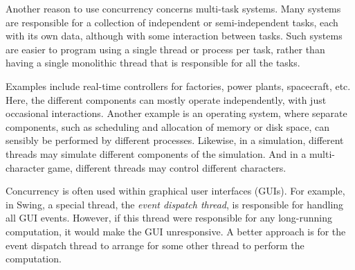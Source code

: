 
Another reason to use concurrency concerns multi-task systems.  Many systems
are responsible for a collection of independent or semi-independent tasks,
each with its own data, although with some interaction between tasks.  Such
systems are easier to program using a single thread or process per task,
rather than having a single monolithic thread that is responsible for all the
tasks.

Examples include real-time controllers for factories, power plants,
spacecraft, etc.  Here, the different components can mostly operate
independently, with just occasional interactions.  Another example is an
operating system, where separate components, such as scheduling and allocation
of memory or disk space, can sensibly be performed by different processes.
Likewise, in a simulation, different threads may simulate different components
of the simulation.  And in a multi-character game, different threads may
control different characters.

Concurrency is often used within graphical user interfaces (GUIs).  For
example, in Swing, a special thread, the \emph{event dispatch thread}, is
responsible for handling all GUI events.  However, if this thread were
responsible for any long-running computation, it would make the GUI
unresponsive.  A better approach is for the event dispatch thread to arrange
for some other thread to perform the computation. 




